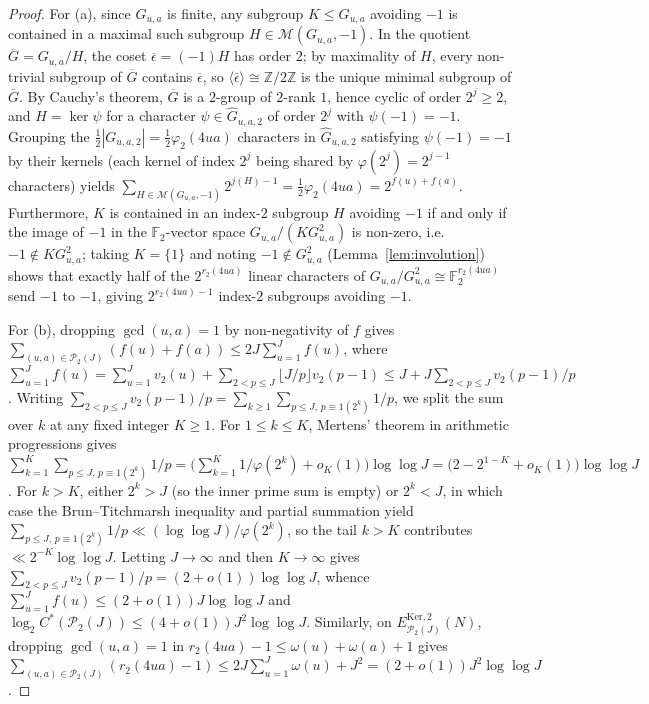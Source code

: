 \documentclass[11pt, a4paper]{article}
\theoremstyle{plain}
\theoremstyle{definition}
\newcommand{\Z}{\mathbb{Z}}
\begin{document}
\begin{proof}
For (a), since $G_{u,a}$ is finite, any subgroup $K\le G_{u,a}$ avoiding $-1$ is contained in a maximal such subgroup $H\in\mathcal{M}(G_{u,a},-1)$. In the quotient $\overline{G}=G_{u,a}/H$, the coset $\overline{\epsilon}=(-1)H$ has order $2$; by maximality of $H$, every non-trivial subgroup of $\overline{G}$ contains $\overline{\epsilon}$, so $\langle\overline{\epsilon}\rangle\cong\Z/2\Z$ is the unique minimal subgroup of $\overline{G}$. By Cauchy's theorem, $\overline{G}$ is a $2$-group of $2$-rank $1$, hence cyclic of order $2^{j}\ge2$, and $H=\ker\psi$ for a character $\psi\in\widehat{G}_{u,a,2}$ of order $2^{j}$ with $\psi(-1)=-1$. Grouping the $\frac12|G_{u,a,2}|=\frac12\varphi_2(4ua)$ characters in $\widehat{G}_{u,a,2}$ satisfying $\psi(-1)=-1$ by their kernels (each kernel of index $2^{j}$ being shared by $\varphi(2^{j})=2^{j-1}$ characters) yields $\sum_{H\in\mathcal{M}(G_{u,a},-1)}2^{j(H)-1}=\frac12\varphi_2(4ua)=2^{f(u)+f(a)}$. Furthermore, $K$ is contained in an index-$2$ subgroup $H$ avoiding $-1$ if and only if the image of $-1$ in the $\mathbb{F}_2$-vector space $G_{u,a}/(K G_{u,a}^{2})$ is non-zero, i.e.\ $-1\notin K G_{u,a}^{2}$; taking $K=\{1\}$ and noting $-1\notin G_{u,a}^{2}$ (Lemma~\ref{lem:involution}) shows that exactly half of the $2^{r_2(4ua)}$ linear characters of $G_{u,a}/G_{u,a}^{2}\cong\mathbb{F}_2^{r_2(4ua)}$ send $-1$ to $-1$, giving $2^{r_2(4ua)-1}$ index-$2$ subgroups avoiding $-1$.

For (b), dropping $\gcd(u,a)=1$ by non-negativity of $f$ gives $\sum_{(u,a)\in\mathcal{P}_2(J)}(f(u)+f(a))\le 2J\sum_{u=1}^{J}f(u)$, where $\sum_{u=1}^{J}f(u)=\sum_{u=1}^{J}v_2(u)+\sum_{2<p\le J}\lfloor J/p\rfloor v_2(p-1)\le J+J\sum_{2<p\le J}v_2(p-1)/p$. Writing $\sum_{2<p\le J}v_2(p-1)/p=\sum_{k\ge1}\sum_{p\le J,\,p\equiv1(2^{k})}1/p$, we split the sum over $k$ at any fixed integer $K\ge1$. For $1\le k\le K$, Mertens' theorem in arithmetic progressions gives $\sum_{k=1}^{K}\sum_{p\le J,\,p\equiv1(2^{k})}1/p=\big(\sum_{k=1}^{K}1/\varphi(2^{k})+o_K(1)\big)\log\log J=\big(2-2^{1-K}+o_K(1)\big)\log\log J$. For $k>K$, either $2^{k}>J$ (so the inner prime sum is empty) or $2^{k}<J$, in which case the Brun--Titchmarsh inequality and partial summation yield $\sum_{p\le J,\,p\equiv1(2^{k})}1/p\ll(\log\log J)/\varphi(2^{k})$, so the tail $k>K$ contributes $\ll 2^{-K}\log\log J$. Letting $J\to\infty$ and then $K\to\infty$ gives $\sum_{2<p\le J}v_2(p-1)/p=(2+o(1))\log\log J$, whence $\sum_{u=1}^{J}f(u)\le(2+o(1))J\log\log J$ and $\log_2 C^{\ast}(\mathcal{P}_2(J))\le(4+o(1))J^{2}\log\log J$. Similarly, on $E_{\mathcal{P}_2(J)}^{\mathrm{Ker,2}}(N)$, dropping $\gcd(u,a)=1$ in $r_2(4ua)-1\le\omega(u)+\omega(a)+1$ gives $\sum_{(u,a)\in\mathcal{P}_2(J)}(r_2(4ua)-1)\le 2J\sum_{u=1}^{J}\omega(u)+J^{2}=(2+o(1))J^{2}\log\log J$.
\end{proof}
\end{document}
